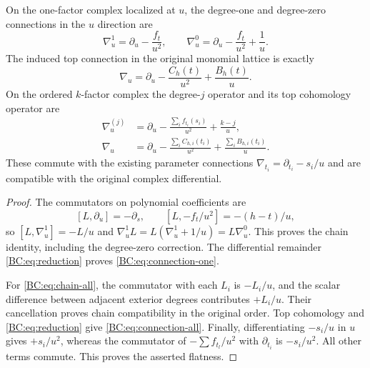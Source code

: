 \begin{theorem}
On the one-factor complex localized at $u$, the degree-one and
degree-zero connections in the $u$ direction are
\begin{equation}
 \nabla_u^1=\partial_u-\frac{f_t}{u^2},\qquad
 \nabla_u^0=\partial_u-\frac{f_t}{u^2}+\frac1u.
 \label{BC:eq:chain-one}
\end{equation}
The induced top connection in the original monomial lattice is exactly
\begin{equation}
 \boxed{\nabla_u=\partial_u-\frac{C_h(t)}{u^2}
                                  +\frac{B_h(t)}u.}
 \label{BC:eq:connection-one}
\end{equation}
On the ordered $k$-factor complex the degree-$j$ operator and its top
cohomology operator are
\begin{align}
 \nabla_u^{(j)}&=\partial_u-
       \frac{\sum_i f_{t_i}(s_i)}{u^2}+\frac{k-j}{u},
       \label{BC:eq:chain-all}\\
 \boxed{\nabla_u}&=\boxed{\partial_u-
       \frac{\sum_i C_{h,i}(t_i)}{u^2}
                +\frac{\sum_i B_{h,i}(t_i)}u.}
       \label{BC:eq:connection-all}
\end{align}
These commute with the existing parameter connections
$\nabla_{t_i}=\partial_{t_i}-s_i/u$ and are compatible with the
original complex differential.
\end{theorem}
\begin{proof}
The commutators on polynomial coefficients are
\[
 [L,\partial_u]=-\partial_s,\qquad
 [L,-f_t/u^2]=-(h-t)/u,
\]
so $[L,\nabla_u^1]=-L/u$ and
$\nabla_u^1L=L(\nabla_u^1+1/u)=L\nabla_u^0$.
This proves the chain identity, including the degree-zero correction.
The differential remainder \eqref{BC:eq:reduction} proves
\eqref{BC:eq:connection-one}.

For \eqref{BC:eq:chain-all}, the commutator with each $L_i$ is
$-L_i/u$, and the scalar difference between adjacent exterior degrees
contributes $+L_i/u$.  Their cancellation proves chain compatibility
in the original order.  Top cohomology and
\eqref{BC:eq:reduction} give \eqref{BC:eq:connection-all}.
Finally, differentiating $-s_i/u$ in $u$ gives $+s_i/u^2$, whereas
the commutator of $-\sum f_{t_l}/u^2$ with $\partial_{t_i}$ is
$-s_i/u^2$.  All other terms commute.  This proves the asserted
flatness.
\end{proof}

